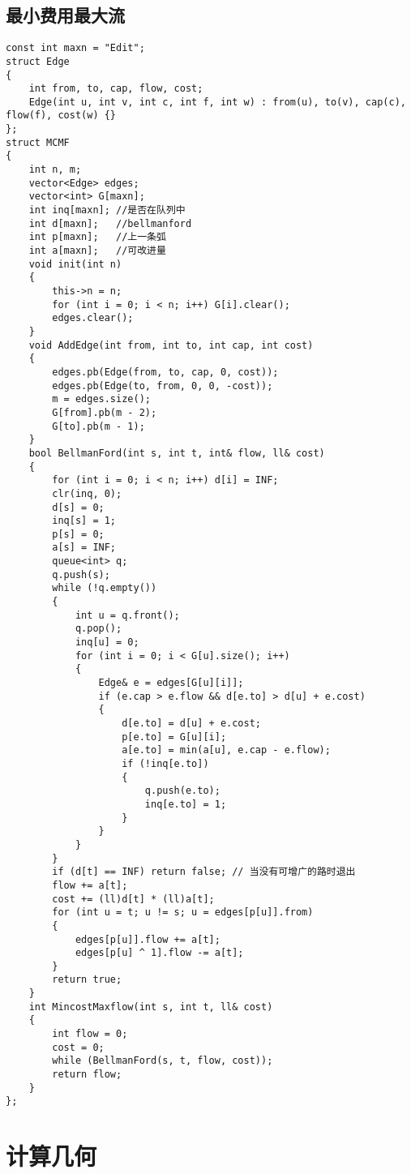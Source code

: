 \documentclass[a4]{article}
\begin{document}
\subsection{最小费用最大流}
\begin{lstlisting}
const int maxn = "Edit";
struct Edge
{
    int from, to, cap, flow, cost;
    Edge(int u, int v, int c, int f, int w) : from(u), to(v), cap(c), flow(f), cost(w) {}
};
struct MCMF
{
    int n, m;
    vector<Edge> edges;
    vector<int> G[maxn];
    int inq[maxn]; //是否在队列中
    int d[maxn];   //bellmanford
    int p[maxn];   //上一条弧
    int a[maxn];   //可改进量
    void init(int n)
    {
        this->n = n;
        for (int i = 0; i < n; i++) G[i].clear();
        edges.clear();
    }
    void AddEdge(int from, int to, int cap, int cost)
    {
        edges.pb(Edge(from, to, cap, 0, cost));
        edges.pb(Edge(to, from, 0, 0, -cost));
        m = edges.size();
        G[from].pb(m - 2);
        G[to].pb(m - 1);
    }
    bool BellmanFord(int s, int t, int& flow, ll& cost)
    {
        for (int i = 0; i < n; i++) d[i] = INF;
        clr(inq, 0);
        d[s] = 0;
        inq[s] = 1;
        p[s] = 0;
        a[s] = INF;
        queue<int> q;
        q.push(s);
        while (!q.empty())
        {
            int u = q.front();
            q.pop();
            inq[u] = 0;
            for (int i = 0; i < G[u].size(); i++)
            {
                Edge& e = edges[G[u][i]];
                if (e.cap > e.flow && d[e.to] > d[u] + e.cost)
                {
                    d[e.to] = d[u] + e.cost;
                    p[e.to] = G[u][i];
                    a[e.to] = min(a[u], e.cap - e.flow);
                    if (!inq[e.to])
                    {
                        q.push(e.to);
                        inq[e.to] = 1;
                    }
                }
            }
        }
        if (d[t] == INF) return false; // 当没有可增广的路时退出
        flow += a[t];
        cost += (ll)d[t] * (ll)a[t];
        for (int u = t; u != s; u = edges[p[u]].from)
        {
            edges[p[u]].flow += a[t];
            edges[p[u] ^ 1].flow -= a[t];
        }
        return true;
    }
    int MincostMaxflow(int s, int t, ll& cost)
    {
        int flow = 0;
        cost = 0;
        while (BellmanFord(s, t, flow, cost));
        return flow;
    }
};
\end{lstlisting}
\clearpage\section{计算几何}
\end{document}
